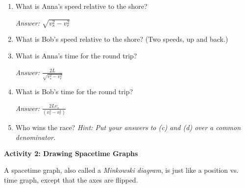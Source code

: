 \begin{enumerate}[labparts]

\item What is Anna's speed relative to the shore?
\answerspace{0.6in}

\hspace{\fill}\textit{Answer: $\sqrt{v_s^2-v_r^2}$}

\item What is Bob's speed relative to the shore?  (Two speeds, up and back.)
\answerspace{0.6in}


\item What is Anna's time for the round trip?
\answerspace{0.6in}

\hspace{\fill}\textit{Answer: $\displaystyle \frac{2L}{\sqrt{v_s^2-v_r^2}}$}

\item What is Bob's time for the round trip?
\answerspace{0.6in}

\hspace{\fill}\textit{Answer: $\displaystyle \frac{2Lv_s}{(v_s^2-v_r^2)}$}

\item Who wins the race? \textit{Hint: Put your answers to (c) and (d) over a common denominator.}
\answerspace{0.8in}

\end{enumerate}

\bigskip
\textbf{Activity 2: Drawing Spacetime Graphs} 

A spacetime graph, also called a \textit{Minkowski diagram}, is just like a position vs. time graph, except that the axes are flipped.

